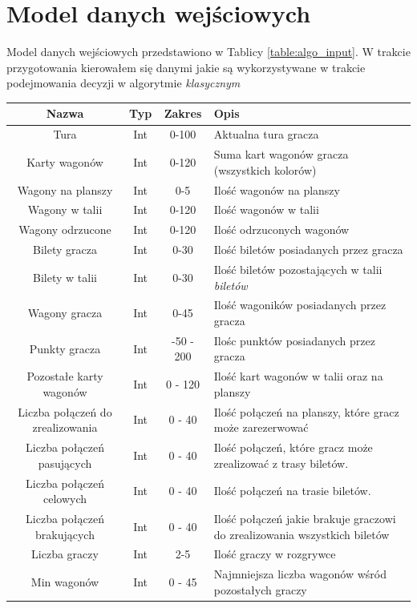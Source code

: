 \documentclass[12pt, oneside]{report}
\begin{document}
\section{Model danych wejściowych}
Model danych wejściowych przedstawiono w Tablicy \ref{table:algo_input}. W trakcie przygotowania kierowałem się danymi jakie są wykorzystywane w trakcie podejmowania decyzji w algorytmie \textit{klasycznym}

\begin{longtable}[h]{| c | c | c | p{6.5cm} |} \hline
	Nazwa & Typ & Zakres & Opis \\ \hline	
	Tura & Int & 0-100 & Aktualna tura gracza \\ \hline
	Karty wagonów & Int & 0-120 & Suma kart wagonów gracza (wszystkich kolorów) \\ \hline
	Wagony na planszy & Int & 0-5 & Ilość wagonów na planszy \\ \hline
	Wagony w talii & Int & 0-120 & Ilość wagonów w talii \\ \hline
	Wagony odrzucone & Int & 0-120 & Ilość odrzuconych wagonów \\ \hline
	Bilety gracza & Int & 0-30 & Ilość biletów posiadanych przez gracza \\ \hline
	Bilety w talii & Int & 0-30 & Ilość biletów pozostających w talii \textit{biletów} \\ \hline
	Wagony gracza & Int & 0-45 & Ilość wagoników posiadanych przez gracza \\ \hline
	Punkty gracza & Int & -50 - 200 & Ilośc punktów posiadanych przez gracza \\ \hline
	Pozostałe karty wagonów & Int & 0 - 120 & Ilość kart wagonów w talii oraz na planszy  \\ \hline
	Liczba połączeń do zrealizowania & Int & 0 - 40 & Ilość połączeń na planszy, które gracz może zarezerwować \\ \hline
	Liczba połączeń pasujących & Int & 0 - 40 & Ilość połączeń, które gracz może zrealizować z trasy biletów. \\ \hline
	Liczba połączeń celowych & Int & 0 - 40 & Ilość połączeń na trasie biletów. \\ \hline
	Liczba połączeń brakujących & Int & 0 - 40 & Ilość połączeń jakie brakuje graczowi do zrealizowania wszystkich biletów \\ \hline
	Liczba graczy & Int & 2-5 & Ilość graczy w rozgrywce \\ \hline
	Min wagonów  & Int & 0 - 45 & Najmniejsza liczba wagonów wśród pozostałych graczy \\ \hline

\end{longtable}
\end{document}
